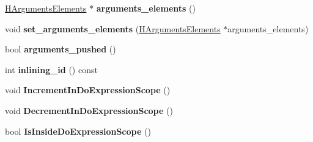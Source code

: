 \begin{DoxyCompactItemize}
\item 
\hyperlink{classv8_1_1internal_1_1_h_arguments_elements}{H\+Arguments\+Elements} $\ast$ {\bfseries arguments\+\_\+elements} ()\hypertarget{classv8_1_1internal_1_1_function_state_a562ae7567bc9ed7cada73813db1175ea}{}\label{classv8_1_1internal_1_1_function_state_a562ae7567bc9ed7cada73813db1175ea}

\item 
void {\bfseries set\+\_\+arguments\+\_\+elements} (\hyperlink{classv8_1_1internal_1_1_h_arguments_elements}{H\+Arguments\+Elements} $\ast$arguments\+\_\+elements)\hypertarget{classv8_1_1internal_1_1_function_state_a86237102273799337bcc294d2bf9068c}{}\label{classv8_1_1internal_1_1_function_state_a86237102273799337bcc294d2bf9068c}

\item 
bool {\bfseries arguments\+\_\+pushed} ()\hypertarget{classv8_1_1internal_1_1_function_state_a4b66a84217d9a867b45d14b8bbe22a7e}{}\label{classv8_1_1internal_1_1_function_state_a4b66a84217d9a867b45d14b8bbe22a7e}

\item 
int {\bfseries inlining\+\_\+id} () const \hypertarget{classv8_1_1internal_1_1_function_state_ae846daafd1f10ca0b599fb96bfb96456}{}\label{classv8_1_1internal_1_1_function_state_ae846daafd1f10ca0b599fb96bfb96456}

\item 
void {\bfseries Increment\+In\+Do\+Expression\+Scope} ()\hypertarget{classv8_1_1internal_1_1_function_state_aeb106c1fac0217284e4a53569ba8ef51}{}\label{classv8_1_1internal_1_1_function_state_aeb106c1fac0217284e4a53569ba8ef51}

\item 
void {\bfseries Decrement\+In\+Do\+Expression\+Scope} ()\hypertarget{classv8_1_1internal_1_1_function_state_abf3a831c6416054d9af6f4a211077861}{}\label{classv8_1_1internal_1_1_function_state_abf3a831c6416054d9af6f4a211077861}

\item 
bool {\bfseries Is\+Inside\+Do\+Expression\+Scope} ()\hypertarget{classv8_1_1internal_1_1_function_state_a51bdbe4052a283625e85c18c7b6f3556}{}\label{classv8_1_1internal_1_1_function_state_a51bdbe4052a283625e85c18c7b6f3556}

\end{DoxyCompactItemize}

